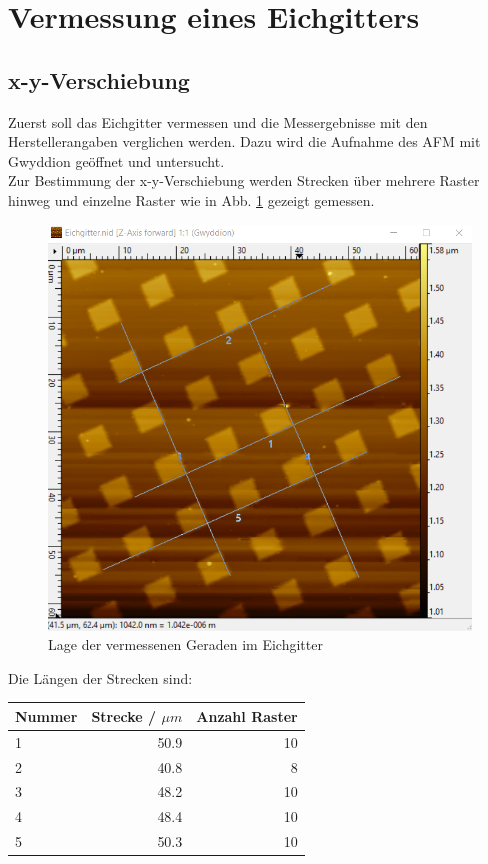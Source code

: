 

\section{Vermessung eines Eichgitters}
\subsection{x-y-Verschiebung}
Zuerst soll das Eichgitter vermessen und die Messergebnisse mit den Herstellerangaben verglichen werden. Dazu wird die Aufnahme des AFM mit 
Gwyddion geöffnet und untersucht.\\
Zur Bestimmung der x-y-Verschiebung werden Strecken über mehrere Raster hinweg und einzelne Raster wie in Abb. \ref{bild:EichWo} gezeigt 
gemessen. 

\begin{figure}[h]
    \centering
    \includegraphics[scale = 0.5]{Bilder/EichGeraden.png}
    \caption{Lage der vermessenen Geraden im Eichgitter}
    \label{bild:EichWo}
\end{figure}
\newpage

Die Längen der Strecken sind:

\begin{center}
    \centering
    \begin{tabular}{l|r r}
        Nummer & Strecke / $\mu m$ & Anzahl Raster \\
        \hline
        1 & 50.9 & 10\\
        2 & 40.8 & 8\\
        3 & 48.2 & 10 \\
        4 & 48.4 & 10 \\
        5 & 50.3 & 10\\
        
    \end{tabular}
\end{center}

